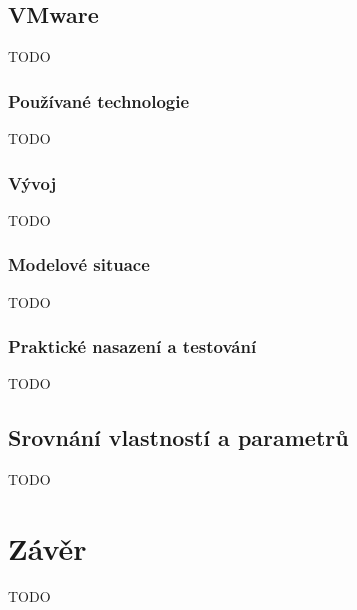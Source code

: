 \subsection{VMware}
TODO
\subsubsection{Používané technologie}
TODO
\subsubsection{Vývoj}
TODO
\subsubsection{Modelové situace}
TODO
\subsubsection{Praktické nasazení a testování}
TODO

\subsection{Srovnání vlastností a parametrů}
TODO

\newpage
\section{Závěr}
TODO